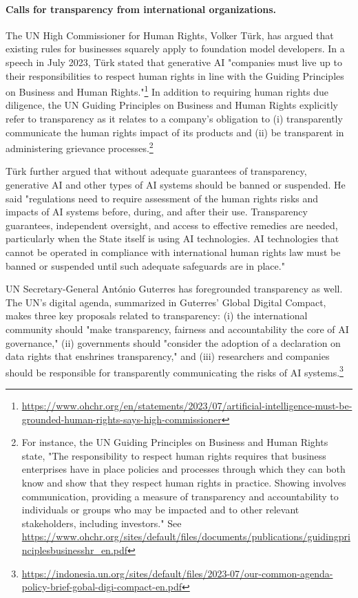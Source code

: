 \paragraph{\textbf{Calls for transparency from international organizations.}}
The UN High Commissioner for Human Rights, Volker Türk, has argued that existing rules for businesses squarely apply to foundation model developers. 
In a speech in July 2023, Türk stated that generative AI "companies must live up to their responsibilities to respect human rights in line with the Guiding Principles on Business and Human Rights."\footnote{\url{https://www.ohchr.org/en/statements/2023/07/artificial-intelligence-must-be-grounded-human-rights-says-high-commissioner}}
In addition to requiring human rights due diligence, the UN Guiding Principles on Business and Human Rights explicitly refer to transparency as it relates to a company's obligation to (i) transparently communicate the human rights impact of its products and (ii) be transparent in administering grievance processes.\footnote{For instance, the UN Guiding Principles on Business and Human Rights state, "The responsibility to respect human rights requires that business enterprises have in place policies and processes through which they can both know and show that they respect human rights in practice. Showing involves communication, providing a measure of transparency and accountability to individuals or groups who may be impacted and to other relevant stakeholders, including investors." See \url{https://www.ohchr.org/sites/default/files/documents/publications/guidingprinciplesbusinesshr_en.pdf}}

Türk further argued that without adequate guarantees of transparency, generative AI and other types of AI systems should be banned or suspended.
He said "regulations need to require assessment of the human rights risks and impacts of AI systems before, during, and after their use. Transparency guarantees, independent oversight, and access to effective remedies are needed, particularly  when the State itself is using AI technologies. AI technologies that cannot be operated in compliance with international human rights law must be  banned or suspended until such adequate safeguards are in place."

UN Secretary-General António Guterres has foregrounded transparency as well. 
The UN's digital agenda, summarized in Guterres' Global Digital Compact, makes three key proposals related to transparency: (i) the international community should "make transparency, fairness and accountability the core of AI governance," (ii) governments should "consider the adoption of a declaration on data rights that enshrines transparency," and (iii) researchers and companies should be responsible for transparently communicating the risks of AI systems.\footnote{\url{https://indonesia.un.org/sites/default/files/2023-07/our-common-agenda-policy-brief-gobal-digi-compact-en.pdf}}

